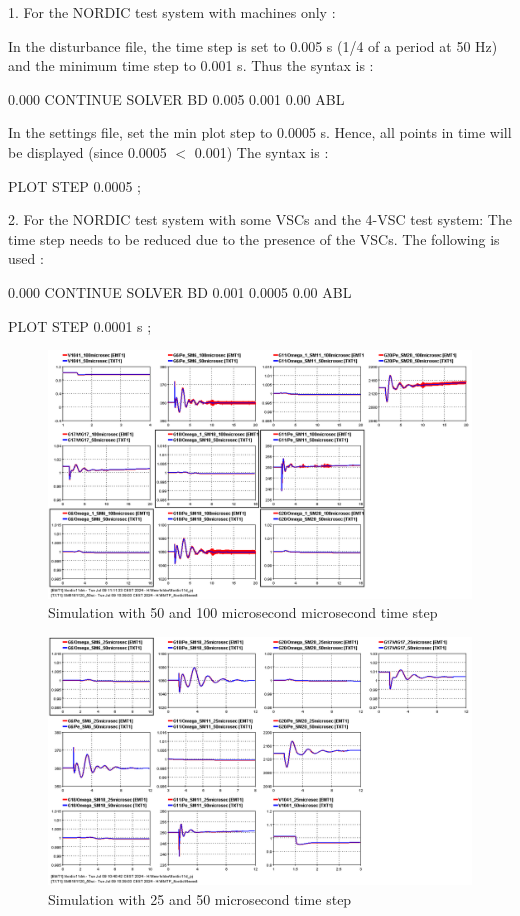 \documentclass{report}
\begin{document}
1. For the NORDIC test system with machines only :

In the disturbance file, the time step is set to 0.005 s (1/4 of a period at 50 Hz) and the minimum time step to 0.001 s.  Thus the syntax is :
  
  0.000 CONTINUE SOLVER BD 0.005 0.001 0.00 ABL

In the settings file, set the min plot step to 0.0005 s. Hence, all points in time will be displayed (since 0.0005 $<$ 0.001) The syntax is :

PLOT STEP  0.0005    ;

2. For the NORDIC test system with some VSCs and the 4-VSC test system: The time step needs to be reduced due to the presence of the VSCs. The following is used :

0.000 CONTINUE SOLVER BD 0.001 0.0005 0.00 ABL

PLOT STEP  0.0001 s  ;

\begin{figure}
    \centering
    \includegraphics[width=0.9\linewidth]{Figure_Nordic/Results/G16Outage/50-100us.png}
    \caption{Simulation with 50 and 100 microsecond microsecond time step}
    \label{fig:50100microsec}
\end{figure}
\begin{figure}
    \centering
    \includegraphics[width=0.9\linewidth]{Figure_Nordic/Results/G16Outage/25_50us.png}
    \caption{Simulation with 25 and 50 microsecond time step}
    \label{fig:2550microsec}
\end{figure}
\end{document}
